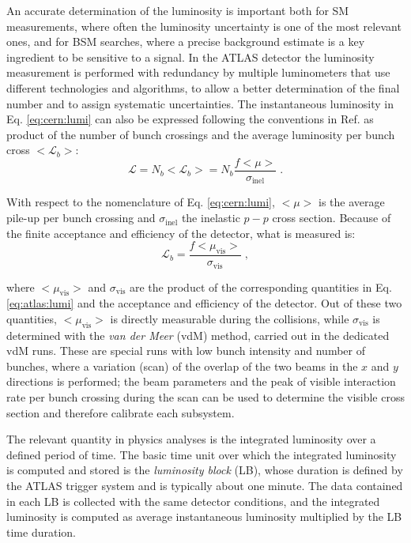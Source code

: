 An accurate determination of the luminosity is important both for SM measurements, where often the luminosity uncertainty is one of the most relevant ones, and for BSM searches, where a precise background estimate is a key ingredient to be sensitive to a signal. In the ATLAS detector the luminosity measurement is performed with redundancy by multiple luminometers that use different technologies and algorithms, to allow a better determination of the final number and to assign systematic uncertainties. The instantaneous luminosity in Eq. \ref{eq:cern:lumi} can also be expressed following the conventions in Ref. \cite{Aaboud:2016hhf} as product of the number of bunch crossings and the average luminosity per bunch cross $<\mathcal{L}_b>$:
\begin{equation}
\mathcal{L} = N_b <\mathcal{L}_b> = N_b \frac{f <\mu>}{\sigma_{\mathrm{inel}} } \; .
\label{eq:atlas:lumi}
\end{equation}

With respect to the nomenclature of Eq. \ref{eq:cern:lumi}, $<\mu>$ is the average pile-up per bunch crossing and $\sigma_{\mathrm{inel}}$ the inelastic $p-p$ cross section. Because of the finite acceptance and efficiency of the detector, what is measured is:
\begin{equation}
\mathcal{L}_b = \frac{f <\mu_\mathrm{vis}>}{\sigma_{\mathrm{vis}} } \; ,
\end{equation}

where $<\mu_\mathrm{vis}>$ and $\sigma_{\mathrm{vis}}$ are the product of the corresponding quantities in Eq. \ref{eq:atlas:lumi} and the acceptance and efficiency of the detector. Out of these two quantities, $<\mu_\mathrm{vis}>$ is directly measurable during the collisions, while $\sigma_{\mathrm{vis}}$ is determined with the \textit{van der Meer} (vdM) method, carried out in the dedicated vdM runs. These are special runs with low bunch intensity and number of bunches, where a variation (scan) of the overlap of the two beams in the $x$ and $y$ directions is performed; the beam parameters and the peak of visible interaction rate per bunch crossing during the scan can be used to determine the visible cross section and therefore calibrate each subsystem. 

The relevant quantity in physics analyses is the integrated luminosity over a defined period of time. The basic time unit over which the integrated luminosity is computed and stored is the \textit{luminosity block} (LB), whose duration is defined by the ATLAS trigger system and is typically about one minute. The data contained in each LB is collected with the same detector conditions, and the integrated luminosity is computed as average instantaneous luminosity multiplied by the LB time duration.

